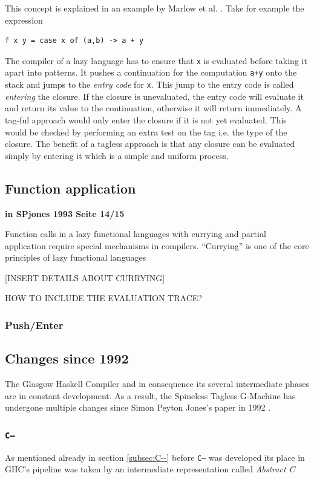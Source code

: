 \documentclass[runningheads]{llncs}
\begin{document}
This concept is explained in an example by Marlow et al. \cite{marlow2007faster}. Take for example the expression

\begin{verbatim}
f x y = case x of (a,b) -> a + y
\end{verbatim}

The compiler of a lazy language has to ensure that \texttt{x} is evaluated before taking it apart into patterns. It pushes a continuation for the computation \texttt{a+y} onto the stack and jumps to the \textit{entry code} for \texttt{x}. This jump to the entry code is called \textit{entering} the closure. If the closure is unevaluated, the entry code will evaluate it and return its value to the continuation, otherwise it will return immediately.
A tag-ful approach would only enter the closure if it is not yet evaluated. This would be checked by performing an extra test on the tag i.e. the type of the closure. The benefit of a tagless approach is that any closure can be evaluated simply by entering it which is a simple and uniform process. \cite{marlow2007faster}



\subsection{Function application}
\textbf{in SPjones 1993 Seite 14/15}

Function calls in a lazy functional languages with currying and partial application require special mechanisms in compilers.
\enquote{Currying} is one of the core principles of lazy functional languages 

[INSERT DETAILS ABOUT CURRYING]


HOW TO INCLUDE THE EVALUATION TRACE?


\subsubsection{Push/Enter}


\subsection{Changes since 1992}
The Glasgow Haskell Compiler and in consequence its several intermediate phases are in constant development. As a result, the Spineless Tagless G-Machine has undergone multiple changes since Simon Peyton Jones's paper in 1992 \cite{jones1992implementing}. 


\subsubsection{\texttt{C--}}
As mentioned already in section \ref{subsec:C--} before \texttt{C--} was developed its place in GHC's pipeline was taken by an intermediate representation called \textit{Abstract C}
\end{document}
